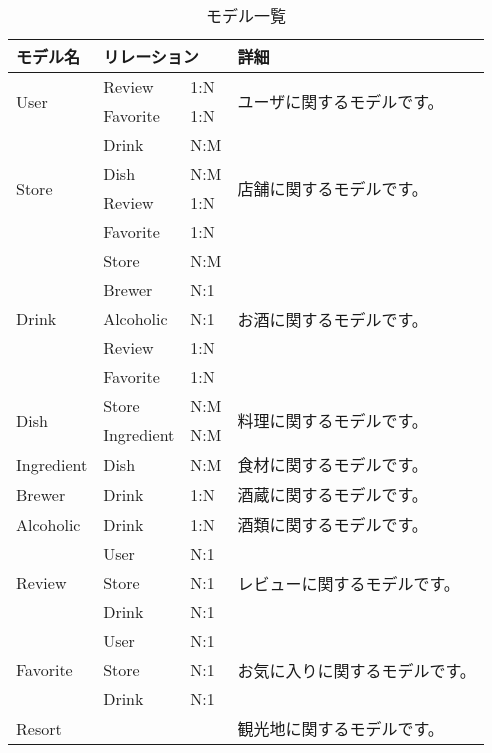 \documentclass[a4j,titlepage]{jarticle}
\begin{document}
\begin{table}[!htbp]
\caption{モデル一覧}
\label{model}
\small
\begin{center}
\begin{tabular}{|l|l|l|p{5cm}|}\hline
モデル名 & \multicolumn{2}{|l|}{リレーション} & 詳細 \\\hline\hline
\multirow{2}{*}{User} & Review & 1:N & \multirow{2}{*}{ユーザに関するモデルです。}\\\cline{2-3}
 & Favorite & 1:N & \\\hline
\multirow{4}{*}{Store} & Drink & N:M & \multirow{4}{*}{店舗に関するモデルです。} \\\cline{2-3}
 & Dish & N:M & \\\cline{2-3}
 & Review & 1:N & \\\cline{2-3}
 & Favorite & 1:N & \\\hline
\multirow{5}{*}{Drink} & Store & N:M & \multirow{5}{*}{お酒に関するモデルです。} \\\cline{2-3}
 & Brewer & N:1 & \\\cline{2-3}
 & Alcoholic & N:1 & \\\cline{2-3}
 & Review & 1:N & \\\cline{2-3}
 & Favorite & 1:N & \\\hline
\multirow{2}{*}{Dish} & Store & N:M & \multirow{2}{*}{料理に関するモデルです。} \\\cline{2-3}
 & Ingredient & N:M & \\\hline
Ingredient & Dish & N:M & 食材に関するモデルです。 \\\hline
Brewer & Drink & 1:N & 酒蔵に関するモデルです。 \\\hline
Alcoholic & Drink & 1:N & 酒類に関するモデルです。 \\\hline
\multirow{3}{*}{Review} & User & N:1 & \multirow{3}{*}{レビューに関するモデルです。} \\\cline{2-3}
 & Store & N:1 & \\\cline{2-3}
 & Drink & N:1 & \\\hline
\multirow{3}{*}{Favorite} & User & N:1 & \multirow{3}{*}{お気に入りに関するモデルです。} \\\cline{2-3}
 & Store & N:1 & \\\cline{2-3}
 & Drink & N:1 & \\\hline
Resort & & & 観光地に関するモデルです。 \\\hline
\end{tabular}
\end{center}
\end{table}
\end{document}
